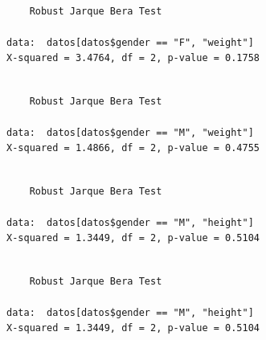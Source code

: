 \documentclass[
  letterpaper,
  DIV=11,
  numbers=noendperiod]{scrartcl}
\newenvironment{Shaded}{\begin{snugshade}}{\end{snugshade}}
\newcommand{\FunctionTok}[1]{\textcolor[rgb]{0.28,0.35,0.67}{#1}}
\newcommand{\NormalTok}[1]{\textcolor[rgb]{0.00,0.23,0.31}{#1}}
\newcommand{\SpecialCharTok}[1]{\textcolor[rgb]{0.37,0.37,0.37}{#1}}
\newcommand{\StringTok}[1]{\textcolor[rgb]{0.13,0.47,0.30}{#1}}
\begin{document}
\begin{verbatim}

    Robust Jarque Bera Test

data:  datos[datos$gender == "F", "weight"]
X-squared = 3.4764, df = 2, p-value = 0.1758
\end{verbatim}

\begin{Shaded}
\end{Shaded}

\begin{verbatim}

    Robust Jarque Bera Test

data:  datos[datos$gender == "M", "weight"]
X-squared = 1.4866, df = 2, p-value = 0.4755
\end{verbatim}

\begin{Shaded}
\end{Shaded}

\begin{verbatim}

    Robust Jarque Bera Test

data:  datos[datos$gender == "M", "height"]
X-squared = 1.3449, df = 2, p-value = 0.5104
\end{verbatim}

\begin{Shaded}
\end{Shaded}

\begin{verbatim}

    Robust Jarque Bera Test

data:  datos[datos$gender == "M", "height"]
X-squared = 1.3449, df = 2, p-value = 0.5104
\end{verbatim}
\end{document}
